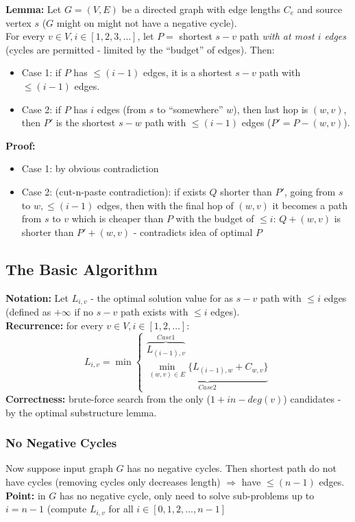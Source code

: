 \documentclass{scrartcl}
\begin{document}
{\bf Lemma: } Let $G = (V, E)$ be a directed graph with edge lengths $C_e$ and
source vertex $s$ ($G$ might on might not have a negative cycle).\\
For every $v \in V, i \in [1, 2, 3, \dots]$, let $P = $ shortest $s-v$ path {\it
  with at most $i$ edges} (cycles are permitted - limited by the ``budget'' of
edges). Then:
\begin{itemize}
\item Case 1: if $P$ has $\leq (i-1)$ edges, it is a shortest $s-v$ path with
  $\leq (i-1)$ edges.
\item Case 2: if $P$ has $i$ edges (from $s$ to ``somewhere'' $w$), then last
  hop is $(w, v)$, then $P'$ is the shortest $s-w$ path with $\leq(i-1)$ edges
  ($P' = P - (w,v)$).
\end{itemize} {\bf Proof: }
\begin{itemize}
\item Case 1: by obvious contradiction
\item Case 2: (cut-n-paste contradiction): if exists $Q$ shorter than $P'$,
  going from $s$ to $w, \leq (i-1)$ edges, then with the final hop of $(w,v)$ it
  becomes a path from $s$ to $v$ which is cheaper than $P$ with the budget of
  $\leq i$: $Q+(w, v)$ is shorter than $P' + (w,v)$ - contradicts idea of
  optimal $P$
\end{itemize}

\subsection{The Basic Algorithm}
\label{sec:14-3} {\bf Notation: } Let $L_{i, v}$ - the optimal solution value
for as $s-v$ path with $\leq i$ edges (defined as $+\infty$ if no $s-v$ path
exists with $\leq i$
edges). \\
{\bf Recurrence: } for every $v \in V, i \in [1, 2, \dots]$:
$$L_{i, v} = \min\left\{
    \begin{smallmatrix}
      \overbrace{L_{(i-1), v}}^{Case 1} \\
      \underbrace{\min_{(w, v) \in E} \{L_{(i-1), w} + C_{w, v} \}}_{Case2}
    \end{smallmatrix} \right.
 $$
 {\bf Correctness: } brute-force search from the only ($1 + in-deg(v)$)
 candidates - by the optimal substructure lemma.

 \subsubsection{No Negative Cycles}
 \label{sec:14-3-1}
 Now suppose input graph $G$ has no negative cycles. Then shortest path do not
 have cycles (removing cycles only decreases length) $\Rightarrow$ have $\leq
 (n-1)$ edges.\\
 {\bf Point: } in $G$ has no negative cycle, only need to solve sub-problems up
 to $i=n-1$ (compute $L_{i, v}$ for all $i \in [0, 1, 2, \dots, n-1]$
\end{document}
